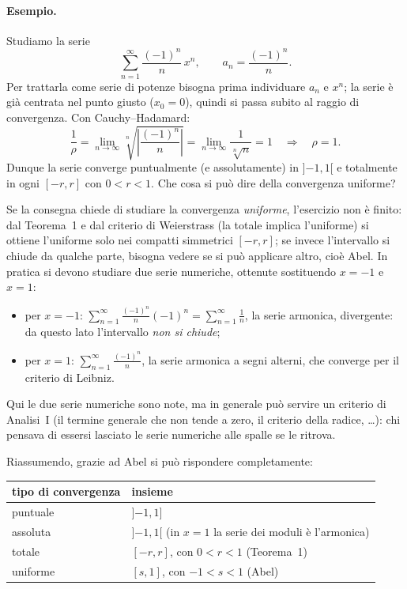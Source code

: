 \paragraph{Esempio.}
Studiamo la serie
\[
  \sum_{n=1}^{\infty} \frac{(-1)^n}{n}\, x^n , \qquad a_n = \frac{(-1)^n}{n} .
\]
Per trattarla come serie di potenze bisogna prima individuare $a_n$ e $x^n$; la serie è già centrata nel punto
giusto ($x_0=0$), quindi si passa subito al raggio di convergenza. Con Cauchy--Hadamard:
\[
  \frac{1}{\rho} = \lim_{n\to\infty} \sqrt[n]{\left|\frac{(-1)^n}{n}\right|}
  = \lim_{n\to\infty} \frac{1}{\sqrt[n]{n}} = 1
  \quad\Longrightarrow\quad \rho = 1 .
\]
Dunque la serie converge puntualmente (e assolutamente) in $]{-1},1[$ e totalmente in ogni $[-r,r]$ con
$0<r<1$. Che cosa si può dire della convergenza uniforme?

Se la consegna chiede di studiare la convergenza \emph{uniforme}, l'esercizio non è finito: dal Teorema~1 e dal
criterio di Weierstrass (la totale implica l'uniforme) si ottiene l'uniforme solo nei compatti simmetrici
$[-r,r]$; se invece l'intervallo si chiude da qualche parte, bisogna vedere se si può applicare altro, cioè Abel.
In pratica si devono studiare due serie numeriche, ottenute sostituendo $x=-1$ e $x=1$:
\begin{itemize}
  \item per $x=-1$:
        $\displaystyle \sum_{n=1}^{\infty} \frac{(-1)^n}{n}(-1)^n = \sum_{n=1}^{\infty} \frac{1}{n}$,
        la serie armonica, divergente: da questo lato l'intervallo \emph{non si chiude};
  \item per $x=1$: $\displaystyle \sum_{n=1}^{\infty} \frac{(-1)^n}{n}$, la serie armonica a segni alterni,
        che converge per il criterio di Leibniz.
\end{itemize}
Qui le due serie numeriche sono note, ma in generale può servire un criterio di Analisi~I (il termine generale
che non tende a zero, il criterio della radice, \dots): chi pensava di essersi lasciato le serie numeriche alle
spalle se le ritrova.

Riassumendo, grazie ad Abel si può rispondere completamente:
\begin{center}
\begin{tabular}{ll}
  \hline
  tipo di convergenza & insieme \\
  \hline
  puntuale   & $]{-1},1]$ \\
  assoluta   & $]{-1},1[$ \quad (in $x=1$ la serie dei moduli è l'armonica) \\
  totale     & $[-r,r]$, con $0<r<1$ \quad (Teorema~1) \\
  uniforme   & $[s,1]$, con $-1<s<1$ \quad (Abel) \\
  \hline
\end{tabular}
\end{center}

